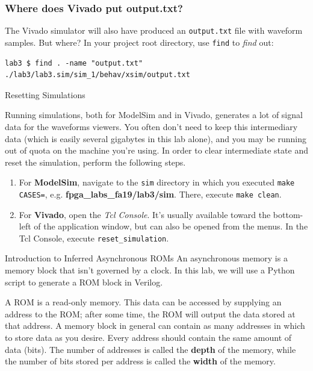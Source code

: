 \documentclass[11pt]{article}
\makeatletter
\newcommand{\RepoRootPath}{fpga\_labs\_fa19}
\renewcommand{\section}
{\@startsection {section}{1}{0pt}
 {-2ex}
 {1ex}
 {\bfseries\Large}}
\renewcommand{\subsection}
{\@startsection {subsection}{1}{0pt}
 {-1ex}
 {0.5ex}
 {\bfseries\normalsize}}
\makeatother
\begin{document}
\subsubsection{Where does Vivado put output.txt?}

The Vivado simulator will also have produced an \verb|output.txt| file with waveform samples. But where? In your project root directory, use \verb|find| to \emph{find} out:

\begin{verbatim}
lab3 $ find . -name "output.txt"
./lab3/lab3.sim/sim_1/behav/xsim/output.txt
\end{verbatim}

\subsection{Resetting Simulations}

Running simulations, both for ModelSim and in Vivado, generates a lot of signal data for the waveforms viewers. You often don't need to keep this intermediary data (which is easily several gigabytes in this lab alone), and you may be running out of quota on the machine you're using. In order to clear intermediate state and reset the simulation, perform the following steps.

\begin{enumerate}
  \item For \textbf{ModelSim}, navigate to the \verb|sim| directory in which you executed \verb|make CASES=|, e.g. \textbf{\RepoRootPath/lab3/sim}. There, execute \verb|make clean|.
  \item For \textbf{Vivado}, open the \emph{Tcl Console}. It's usually available toward the bottom-left of the application window, but can also be opened from the menus. In the Tcl Console, execute \verb|reset_simulation|.
\end{enumerate}

\section{Introduction to Inferred Asynchronous ROMs}
An asynchronous memory is a memory block that isn't governed by a clock. In this lab, we will use a Python script to generate a ROM block in Verilog.

A ROM is a read-only memory. This data can be accessed by supplying an address to the ROM; after some time, the ROM will output the data stored at that address. A memory block in general can contain as many addresses in which to store data as you desire. Every address should contain the same amount of data (bits). The number of addresses is called the \textbf{depth} of the memory, while the number of bits stored per address is called the \textbf{width} of the memory.
\end{document}
